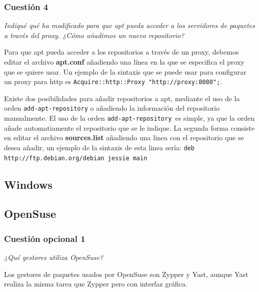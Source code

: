 \subsubsection{Cuestión 4}
\textit{Indiqué qué ha modificado para que apt pueda acceder a los servidores de paquetes a través del proxy. ¿Cómo añadimos un nuevo repositorio?}
\newline

Para que apt pueda acceder a los repositorios a través de un proxy, debemos editar el archivo \textbf{apt.conf} añadiendo una línea en la que se especifica el proxy que se quiere usar. Un ejemplo de la sintaxis que se puede usar para configurar un proxy para http es \cite{aptpx2}  \texttt{Acquire::http::Proxy "http://proxy:8080";}. \cite{aptpx1} 

Existe dos posibilidades para añadir repositorios a apt, mediante el uso de la orden \texttt{add-apt-repository} \cite{aptadd1} o añadiendo la información del repositorio manualmente\cite{aptadd2}. El uso de la orden \texttt{add-apt-repository }es simple, ya que la orden añade automatiamente el repositorio que se le indique. La segunda forma consiste en editar el archivo \textbf{sources.list }añadiendo una linea con el repositorio que se desea añadir, un ejemplo de la sintaxis de esta linea sería:  \texttt{deb http://ftp.debian.org/debian jessie main
}
\subsection{Windows}

\subsection{OpenSuse}
\subsubsection{Cuestión opcional 1}
\textit{¿Qué gestores utiliza OpenSuse?}
\newline
 
Los gestores de paquetes usados por OpenSuse son Zypper y Yast, aunque Yast realiza la misma tarea que Zypper pero con interfaz gráfica. \cite{os1} \cite{os2} \cite{os3}





